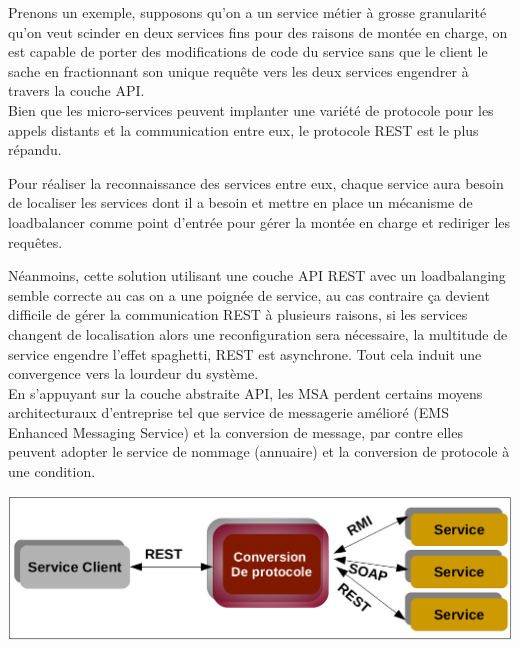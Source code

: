 \documentclass[12pt, a4paper, openany]{report}
\begin{document}
    Prenons un exemple, supposons qu'on a un service métier à grosse granularité qu'on veut scinder en deux services fins pour des raisons de montée en charge, on est capable de porter des modifications de code du service sans que le client le sache en fractionnant son unique requête vers les deux services engendrer à travers la couche API.\\
    
    Bien que les micro-services peuvent implanter une variété de protocole pour les appels distants et la communication entre eux, le protocole REST est le plus répandu.
    
    Pour réaliser la reconnaissance des services entre eux, chaque service aura besoin de localiser les services dont il a besoin et mettre en place un mécanisme de loadbalancer comme point d'entrée pour gérer la montée en charge et rediriger les requêtes.
    
    Néanmoins, cette solution utilisant une couche API REST avec un loadbalanging semble correcte au cas on a une poignée de service, au cas contraire ça devient difficile de gérer la communication REST à plusieurs raisons, si les services changent de localisation alors une reconfiguration sera nécessaire, la multitude de service engendre l'effet spaghetti, REST est asynchrone. Tout cela induit une convergence vers la lourdeur du système. \\
     
    En s’appuyant sur la couche abstraite API, les MSA perdent certains moyens architecturaux d'entreprise tel que service de messagerie amélioré (EMS Enhanced Messaging Service) et la conversion de message, par contre elles peuvent adopter le service de nommage (annuaire) et la conversion de protocole à une condition.\\
    
    \begin{center}
      \includegraphics[scale=0.3]{convers_protoco_19.png}
      \label{fig19}
    \end{center}
    
\end{document}
